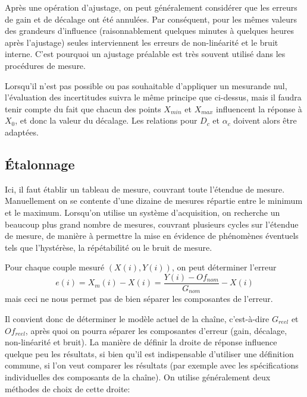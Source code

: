\documentclass[main.tex]{subfiles}
\begin{document}
Après une opération d'ajustage, on peut généralement considérer que les erreurs de gain et de décalage ont été annulées. Par conséquent, pour les mêmes valeurs des grandeurs d'influence (raisonnablement quelques minutes à quelques heures après l'ajustage) seules interviennent les erreurs de non-linéarité et le bruit interne. C'est pourquoi un ajustage préalable est très souvent utilisé dans les procédures de mesure.


Lorsqu'il n'est pas possible ou pas souhaitable d'appliquer un mesurande nul, l'évaluation des incertitudes suivra le même principe que ci-dessus, mais il faudra tenir compte du fait que chacun des points $X_{min}$ et $X_{max}$ influencent la réponse à $X_{0}$, et donc la valeur du décalage. Les relations pour $D_{c}$ et $\alpha_{c}$ doivent alors être adaptées.

\subsection{Étalonnage}

Ici, il faut établir un tableau de mesure, couvrant toute l'étendue de mesure. Manuellement on se contente d'une dizaine de mesures répartie entre le minimum et le maximum. Lorsqu'on utilise un système d'acquisition, on recherche un beaucoup plus grand nombre de mesures, couvrant plusieurs cycles sur l'étendue de mesure, de manière à permettre la mise en évidence de phénomènes éventuels tels que l'hystérèse, la répétabilité ou le bruit de mesure.

Pour chaque couple mesuré $(X(i), Y(i))$, on peut déterminer l'erreur
\[
    e(i) = X_m(i) - X(i) = \frac{Y(i) - Of_{nom}}{G_{nom}}   -X(i)
\]
mais ceci ne nous permet pas de bien séparer les composantes de l'erreur.

Il convient donc de déterminer le modèle actuel de la chaîne, c'est-à-dire $G_{reel}$ et $Of_{reel}$, après quoi on pourra séparer les composantes d'erreur (gain, décalage, non-linéarité et bruit). La manière de définir la droite de réponse influence quelque peu les résultats, si bien qu'il est indispensable d'utiliser une définition commune, si l'on veut comparer les résultats (par exemple avec les spécifications individuelles des composants de la chaîne). On utilise généralement deux méthodes de choix de cette droite:
\begin{center}
\end{center}
\end{document}
